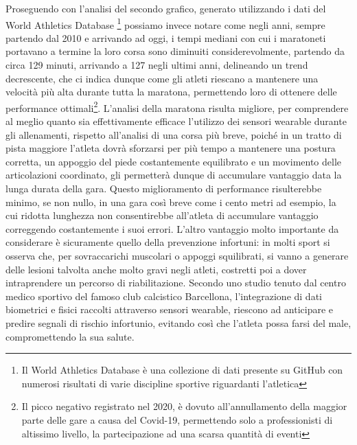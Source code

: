 \documentclass[target=bach,aauheader=,style=]{thud}
\begin{document}
Proseguendo con l'analisi del secondo grafico, generato utilizzando i dati del World Athletics Database \cite{camminady2023wa}\footnote{Il World Athletics Database è una collezione di dati presente su GitHub con numerosi risultati di varie discipline sportive riguardanti l'atletica} possiamo invece notare come negli anni, sempre partendo dal 2010 e arrivando ad oggi, i tempi mediani con cui i maratoneti portavano a termine la loro corsa sono diminuiti considerevolmente, partendo da circa 129 minuti, arrivando a 127 negli ultimi anni, delineando un trend decrescente, che ci indica dunque come gli atleti riescano a mantenere una velocità più alta durante tutta la maratona, permettendo loro di ottenere delle performance ottimali\footnote{Il picco negativo registrato nel 2020, è dovuto all'annullamento della maggior parte delle gare a causa del Covid-19, permettendo solo a professionisti di altissimo livello, la partecipazione ad una scarsa quantità di eventi}. L'analisi della maratona risulta migliore, per comprendere al meglio quanto sia effettivamente efficace l'utilizzo dei sensori wearable durante gli allenamenti, rispetto all'analisi di una corsa più breve, poiché in un tratto di pista maggiore l'atleta dovrà sforzarsi per più tempo a mantenere una postura corretta, un appoggio del piede costantemente equilibrato e un movimento delle articolazioni coordinato, gli permetterà dunque di accumulare vantaggio data la lunga durata della gara. Questo miglioramento di performance risulterebbe minimo, se non nullo, in una gara così breve come i cento metri ad esempio, la cui ridotta lunghezza non consentirebbe all'atleta di accumulare vantaggio correggendo costantemente i suoi errori. L'altro vantaggio molto importante da considerare è sicuramente quello della prevenzione infortuni: in molti sport si osserva che, per sovraccarichi muscolari o appoggi squilibrati, si vanno a generare delle lesioni talvolta anche molto gravi negli atleti, costretti poi a dover intraprendere un percorso di riabilitazione. Secondo uno studio \cite{barca_innovationhub_2025} tenuto dal centro medico sportivo del famoso club calcistico Barcellona, l'integrazione di dati biometrici e fisici raccolti attraverso sensori wearable, riescono ad anticipare e predire segnali di rischio infortunio, evitando così che l'atleta possa farsi del male, compromettendo la sua salute.
\end{document}
